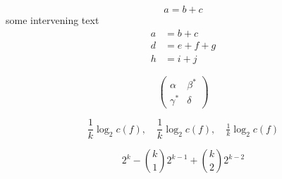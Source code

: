 \documentclass{article}
\begin{document}


\begin{equation}\label{first}
a=b+c
\end{equation}
some intervening text
\begin{subequations}\label{grp} %
\begin{align}
a&=b+c\label{second}\\
d&=e+f+g\label{third}\\
h&=i+j\label{fourth}
\end{align}
\end{subequations}


\begin{equation}
\begin{pmatrix}
\alpha& \beta^{*}\\
\gamma^{*}& \delta
\end{pmatrix}
\end{equation}

\begin{equation}
\frac{1}{k}\log_2 c(f),\quad\dfrac{1}{k}\log_2 c(f),
\quad\tfrac{1}{k}\log_2 c(f)
\end{equation}

\begin{equation}
2^k-\binom{k}{1}2^{k-1}+\binom{k}{2}2^{k-2}
\end{equation}
\end{document}
